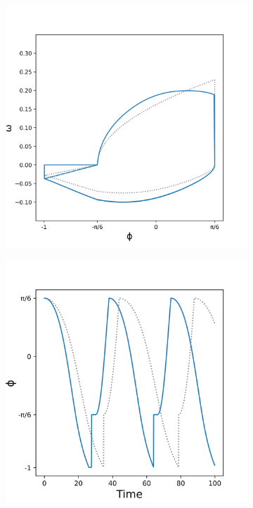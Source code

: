 \documentclass{article}
\begin{document}
\begin{figure}[htbp]
  \centering
  \begin{subfigure}[b]{0.5\textwidth}
    \vspace{0pt} %
    \centering
    \includegraphics[width=\textwidth]{../plots/trajectory2_126_116.png}
    \caption{}
    \label{fig:DuckPlot2Cheat}
  \end{subfigure}%
  \hspace{-15pt}%
  \begin{subfigure}[b]{0.5\textwidth}
    \vspace{0pt} %
    \centering
    \includegraphics[width=\textwidth]{../plots/angleTime2_126_116.png}

\end{subfigure}
\end{figure}
\end{document}
